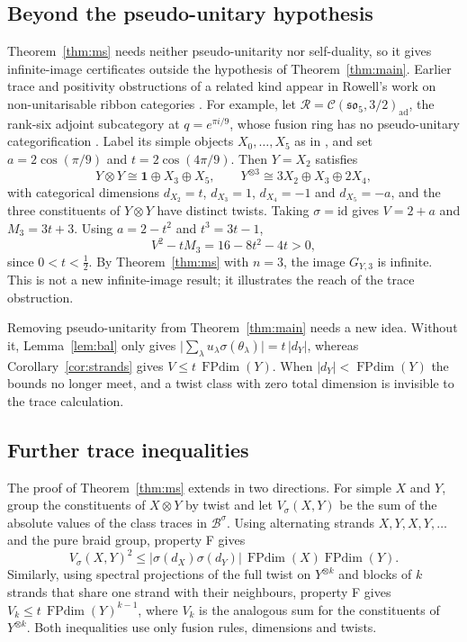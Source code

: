 \documentclass[11pt,oneside]{amsart}
\theoremstyle{remark}
\newcommand{\one}{\mathbf 1}
\newcommand{\FP}{\operatorname{FPdim}}
\begin{document}
\subsection{Beyond the pseudo-unitary hypothesis}
Theorem~\ref{thm:ms} needs neither pseudo-unitarity nor self-duality, so it
gives infinite-image certificates outside the hypothesis of
Theorem~\ref{thm:main}. Earlier trace and positivity obstructions of a related
kind appear in Rowell's work on non-unitarisable ribbon categories
\cite{Row04}. For example, let
$\mathcal R=\mathcal C(\mathfrak{so}_5,3/2)_{\mathrm{ad}}$, the rank-six
adjoint subcategory at $q=e^{\pi i/9}$, whose fusion ring has no pseudo-unitary
categorification \cite[Theorem~1]{Sch}. Label its simple objects
$X_0,\ldots,X_5$ as in \cite{Sch,Row05}, and set $a=2\cos(\pi/9)$ and $t=2\cos(4\pi/9)$. Then $Y=X_2$ satisfies
\[
Y\otimes Y\cong\one\oplus X_3\oplus X_5,\qquad
Y^{\otimes3}\cong3X_2\oplus X_3\oplus2X_4,
\]
with categorical dimensions $d_{X_2}=t$, $d_{X_3}=1$, $d_{X_4}=-1$ and
$d_{X_5}=-a$, and the three constituents of $Y\otimes Y$ have distinct twists.
Taking $\sigma=\mathrm{id}$ gives $V=2+a$ and $M_3=3t+3$. Using $a=2-t^2$ and
$t^3=3t-1$,
\[
V^2-tM_3=16-8t^2-4t>0,
\]
since $0<t<\tfrac12$. By Theorem~\ref{thm:ms} with $n=3$, the image $G_{Y,3}$
is infinite. This is not a new infinite-image result; it illustrates the reach
of the trace obstruction.

Removing pseudo-unitarity from Theorem~\ref{thm:main} needs a new idea. Without
it, Lemma~\ref{lem:bal} only gives
$\bigl|\sum_\lambda u_\lambda\sigma(\theta_\lambda)\bigr|=t\,|d_Y|$, whereas
Corollary~\ref{cor:strands} gives $V\le t\,\FP(Y)$. When $|d_Y|<\FP(Y)$ the
bounds no longer meet, and a twist class with zero total dimension is invisible
to the trace calculation.

\subsection{Further trace inequalities}
The proof of Theorem~\ref{thm:ms} extends in two directions. For simple $X$ and
$Y$, group the constituents of $X\otimes Y$ by twist and let $V_\sigma(X,Y)$ be
the sum of the absolute values of the class traces in $\mathcal B^\sigma$. Using
alternating strands $X,Y,X,Y,\ldots$ and the pure braid group, property F gives
\[
V_\sigma(X,Y)^2\le|\sigma(d_X)\sigma(d_Y)|\,\FP(X)\FP(Y).
\]
Similarly, using spectral projections of the full twist on $Y^{\otimes k}$ and
blocks of $k$ strands that share one strand with their neighbours, property F
gives $V_k\le t\,\FP(Y)^{k-1}$, where $V_k$ is the analogous sum for the
constituents of $Y^{\otimes k}$. Both inequalities use only fusion rules,
dimensions and twists.
\end{document}
